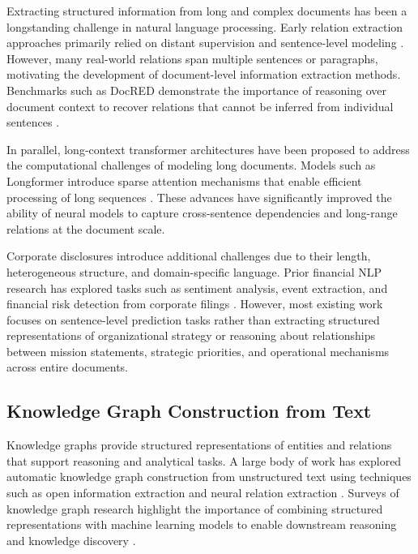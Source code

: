 \documentclass[11pt]{article}
\begin{document}
Extracting structured information from long and complex documents has been a longstanding challenge in natural language processing. Early relation extraction approaches primarily relied on distant supervision and sentence-level modeling \cite{mintz2009distant,miwa2016relation}. However, many real-world relations span multiple sentences or paragraphs, motivating the development of document-level information extraction methods. Benchmarks such as DocRED demonstrate the importance of reasoning over document context to recover relations that cannot be inferred from individual sentences \cite{yao2019docred}.

In parallel, long-context transformer architectures have been proposed to address the computational challenges of modeling long documents. Models such as Longformer introduce sparse attention mechanisms that enable efficient processing of long sequences \cite{beltagy2020longformer}. These advances have significantly improved the ability of neural models to capture cross-sentence dependencies and long-range relations at the document scale.

Corporate disclosures introduce additional challenges due to their length, heterogeneous structure, and domain-specific language. Prior financial NLP research has explored tasks such as sentiment analysis, event extraction, and financial risk detection from corporate filings \cite{loughran2011liability,araci2019finbert}. However, most existing work focuses on sentence-level prediction tasks rather than extracting structured representations of organizational strategy or reasoning about relationships between mission statements, strategic priorities, and operational mechanisms across entire documents.

\subsection{Knowledge Graph Construction from Text}

Knowledge graphs provide structured representations of entities and relations that support reasoning and analytical tasks. A large body of work has explored automatic knowledge graph construction from unstructured text using techniques such as open information extraction and neural relation extraction \cite{banko2007openie,miwa2016relation}. Surveys of knowledge graph research highlight the importance of combining structured representations with machine learning models to enable downstream reasoning and knowledge discovery \cite{ji2022survey}.
\end{document}
